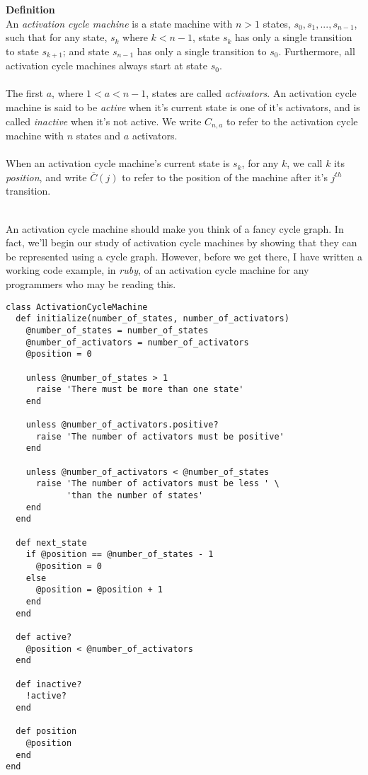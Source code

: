 \documentclass[a4paper,12pt]{article}
\begin{document}
\begin{tcolorbox}
\textbf{Definition}\\
An \textit{activation cycle machine} is a state machine with $n > 1$ states, $s_0, s_1, ..., s_{n-1}$, such that for any state, $s_k$ where $k < n - 1$, state $s_k$ has only a single transition to state $s_{k+1}$; and state $s_{n-1}$ has only a single transition to $s_0$. Furthermore, all activation cycle machines always start at state $s_0$.\\
\\
The first $a$, where $1 < a < n - 1$, states are called \textit{activators}. An activation cycle machine is said to be \textit{active} when it's current state is one of it's activators, and is called \textit{inactive} when it's not active. We write $C_{n,a}$ to refer to the activation cycle machine with $n$ states and $a$ activators.\\
\\
When an activation cycle machine's current state is $s_k$, for any $k$, we call $k$ its \textit{position}, and write $\overline{C}(j)$ to refer to the position of the machine after it's $j^{th}$ transition. 
\end{tcolorbox}
\noindent
\\
An activation cycle machine should make you think of a fancy cycle graph. In fact, we'll begin our study of activation cycle machines by showing that they can be represented using a cycle graph. However, before we get there, I have written a working code example, in \textit{ruby}, of an activation cycle machine for any programmers who may be reading this.
\begin{tcolorbox}
\begin{verbatim}
class ActivationCycleMachine
  def initialize(number_of_states, number_of_activators)
    @number_of_states = number_of_states
    @number_of_activators = number_of_activators
    @position = 0
    
    unless @number_of_states > 1
      raise 'There must be more than one state'
    end
    
    unless @number_of_activators.positive?
      raise 'The number of activators must be positive'
    end
    
    unless @number_of_activators < @number_of_states
      raise 'The number of activators must be less ' \
            'than the number of states'
    end
  end

  def next_state
    if @position == @number_of_states - 1
      @position = 0
    else
      @position = @position + 1
    end
  end
  
  def active?
    @position < @number_of_activators
  end
  
  def inactive?
    !active?
  end
  
  def position
    @position
  end
end
\end{verbatim}
\end{tcolorbox}
\end{document}
